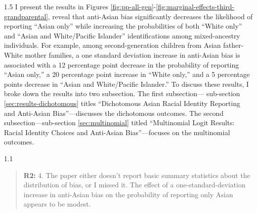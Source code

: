 \documentclass[12pt,english]{article}
\newcommand{\rrquote}{1.1}
\newcommand{\rrxspc}{1.5}
\begin{document}
\begin{refsection}
\begin{spacing}{\rrxspc}
            I present the results in Figures \ref{fig:pp-all-gen}-\ref{fig:marginal-effects-third-grandparental}, reveal that anti-Asian bias significantly decreases the likelihood of reporting ``Asian only'' while increasing the probabilities of both ``White only'' and ``Asian and White/Pacific Islander'' identifications among mixed-ancestry individuals. For example, among second-generation children from Asian father-White mother families, a one standard deviation increase in anti-Asian bias is associated with a 12 percentage point decrease in the probability of reporting ``Asian only,'' a 20 percentage point increase in ``White only,'' and a 5 percentage points decrease in ``Asian and White/Pacific Islander.'' To discuss these results, I broke down the results into two subsection. The first subsection--- sub-section \ref{sec:results-dichotomous} titles ``Dichotomous Asian Racial Identity Reporting and Anti-Asian Bias''---discusses the dichotomous outcomes. The second subsection---sub-section \ref{sec:multinomial} titled ``Multinomial Logit Results: Racial Identity Choices and Anti-Asian Bias''---focuses on the multinomial outcomes.

    \end{spacing}

    \begin{spacing}{\rrquote}
        \begin{quotation}
        \textbf{R2: } 4. The paper either doesn’t report basic summary statistics about the distribution of bias, or I missed it. The effect of a one-standard-deviation increase in anti-Asian bias on the probability of reporting only Asian appears to be modest.
        \end{quotation}
        \end{spacing}
        

\end{refsection}
\end{document}
